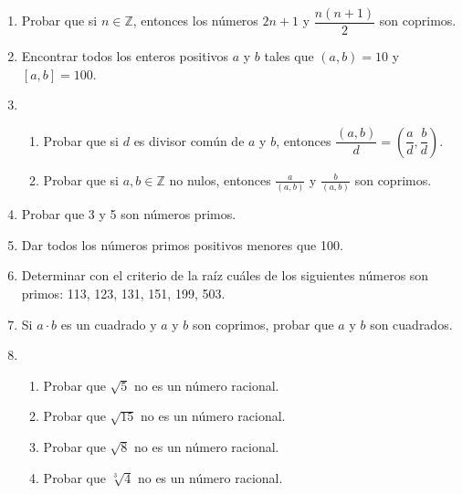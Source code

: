 \documentclass[12pt,spanish,makeidx]{amsbook}
\begin{document}
\begin{enumerate}
\begin{enumerate}
\end{enumerate}



\smallskip

\item Probar que si $n \in {\mathbb Z}$, entonces los números $2n+1$ y $\dfrac{n(n+1)}{2}$ son coprimos.

\smallskip



\item Encontrar todos los enteros positivos $a$ y $b$ tales que $(a,b)=10$ y $[a,b]=100$.


\smallskip
\item
\begin{enumerate}
\item Probar que si $d$ es divisor común de $a$ y $b$, entonces $\dfrac{(a,b)}{d} = \left(\dfrac{a}{d}, \dfrac{b}{d}\right)$.
\item Probar que si $a,b\in \mathbb Z$ no nulos, entonces  $\displaystyle \frac a{(a,b)}$ y $\displaystyle \frac b{(a,b)}$ son coprimos.
\end{enumerate}

\smallskip

\item Probar que 3  y 5 son números primos.

\smallskip

\item  Dar todos los números primos positivos menores que 100.

\smallskip

\item Determinar con el criterio de la raíz  cuáles de los siguientes números son primos: 113, 123, 131, 151, 199, 503.

\smallskip

\item Si $a\cdot b$ es un cuadrado y $a$ y $b$ son coprimos, probar que $a$ y $b$ son cuadrados.

\smallskip

\item 
\begin{enumerate}
	\item Probar  que $\sqrt{5}$ no es un número racional.   
	\item Probar  que $\sqrt{15}$ no es un número racional.  
	\item Probar  que $\sqrt{8}$ no es un número racional.  
	\item Probar  que $\sqrt[3]{4}$ no es un número racional.
\end{enumerate}



\end{enumerate}
\end{document}
